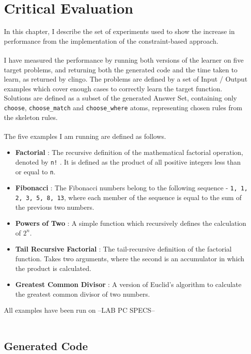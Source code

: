 \chapter{Critical Evaluation}

In this chapter, I describe the set of experiments used to show the increase in performance from the implementation of the constraint-based approach. \\ \\
I have measured the performance by running both versions of the learner on five target problems, and returning both the generated code and the time taken to learn, as returned by clingo. The problems are defined by a set of Input / Output examples which cover enough cases to correctly learn the target function. Solutions are defined as a subset of the generated Answer Set, containing only \lstinline{choose}, \lstinline{choose_match} and \lstinline{choose_where} atoms, representing chosen rules from the skeleton rules. \\ \\%
The five examples I am running are defined as follows.
\begin{itemize}
\item \textbf{Factorial} : The recursive definition of the mathematical factorial operation, denoted by \lstinline{n!} . It is defined as the product of all positive integers less than or equal to \lstinline{n}.%
\item \textbf{Fibonacci} : The Fibonacci numbers belong to the following sequence - \lstinline{1, 1, 2, 3, 5, 8, 13}, where each member of the sequence is equal to the sum of the previous two numbers. %
\item \textbf{Powers of Two} : A simple function which recursively defines the calculation of $2^n$.
\item \textbf{Tail Recursive Factorial} : The tail-recursive definition of the factorial function. Takes two arguments, where the second is an accumulator in which the product is calculated.
\item \textbf{Greatest Common Divisor} : A version of Euclid's algorithm to calculate the greatest common divisor of two numbers.
\end{itemize}
All examples have been run on --LAB PC SPECS-- \\ \\

\pagebreak

\section{Generated Code}

